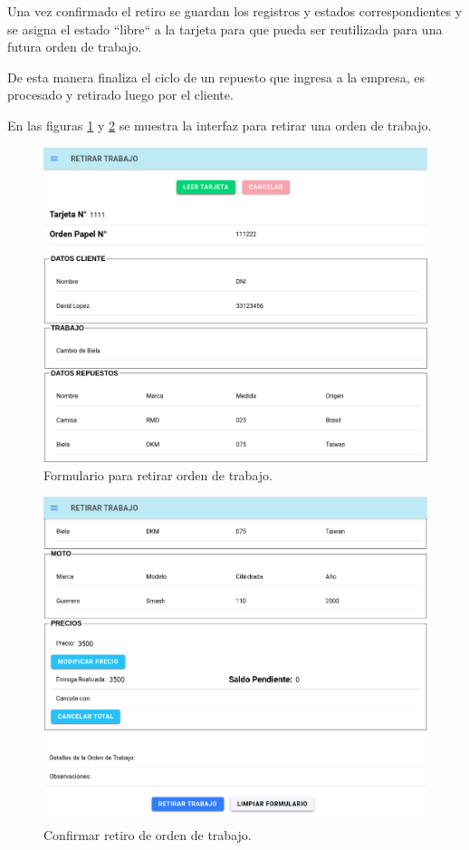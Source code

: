 Una vez confirmado el retiro se guardan los registros y estados correspondientes y se asigna el estado ``libre`` a la tarjeta para que pueda ser reutilizada para una futura orden de trabajo.

De esta manera finaliza el ciclo de un repuesto que ingresa a la empresa, es procesado y retirado luego por el cliente.

En las figuras \ref{fig:retirar1} y \ref{fig:retirar2} se muestra la interfaz para retirar una orden de trabajo.

\begin{figure}[H]
	\centering
	\includegraphics[scale=.35]{./Figures/retirar-1.png}
	\caption{Formulario para retirar orden de trabajo.}
	\label{fig:retirar1}
\end{figure}

\begin{figure}[H]
	\centering
	\includegraphics[scale=.35]{./Figures/retirar-2.png}
	\caption{Confirmar retiro de orden de trabajo.}
	\label{fig:retirar2}
\end{figure}

